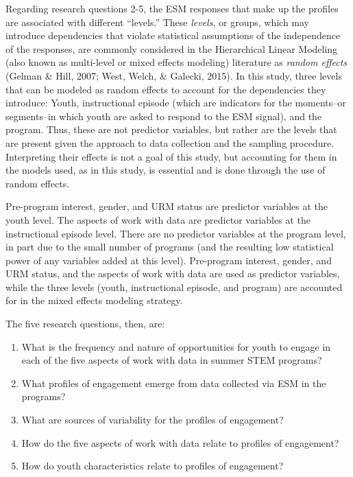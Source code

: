 \documentclass[]{book}
\providecommand{\tightlist}{%
  \setlength{\itemsep}{0pt}\setlength{\parskip}{0pt}}
\theoremstyle{definition}
\theoremstyle{definition}
\theoremstyle{definition}
\theoremstyle{remark}
\begin{document}
Regarding research questions 2-5, the ESM responses that make up the
profiles are associated with different ``levels.'' These \emph{levels},
or groups, which may introduce dependencies that violate statistical
assumptions of the independence of the responses, are commonly
considered in the Hierarchical Linear Modeling (also known as
multi-level or mixed effects modeling) literature as \emph{random
effects} (Gelman \& Hill, 2007; West, Welch, \& Galecki, 2015). In this
study, three levels that can be modeled as random effects to account for
the dependencies they introduce: Youth, instructional episode (which are
indicators for the moments--or segments--in which youth are asked to
respond to the ESM signal), and the program. Thus, these are not
predictor variables, but rather are the levels that are present given
the approach to data collection and the sampling procedure. Interpreting
their effects is not a goal of this study, but accounting for them in
the models used, as in this study, is essential and is done through the
use of random effects.

Pre-program interest, gender, and URM status are predictor variables at
the youth level. The aspects of work with data are predictor variables
at the instructional episode level. There are no predictor variables at
the program level, in part due to the small number of programs (and the
resulting low statistical power of any variables added at this level).
Pre-program interest, gender, and URM status, and the aspects of work
with data are used as predictor variables, while the three levels
(youth, instructional episode, and program) are accounted for in the
mixed effects modeling strategy.

The five research questions, then, are:

\begin{enumerate}
\def\labelenumi{\arabic{enumi}.}
\tightlist
\item
  What is the frequency and nature of opportunities for youth to engage
  in each of the five aspects of work with data in summer STEM programs?
\item
  What profiles of engagement emerge from data collected via ESM in the
  programs?
\item
  What are sources of variability for the profiles of engagement?
\item
  How do the five aspects of work with data relate to profiles of
  engagement?
\item
  How do youth characteristics relate to profiles of engagement?
\end{enumerate}
\end{document}

